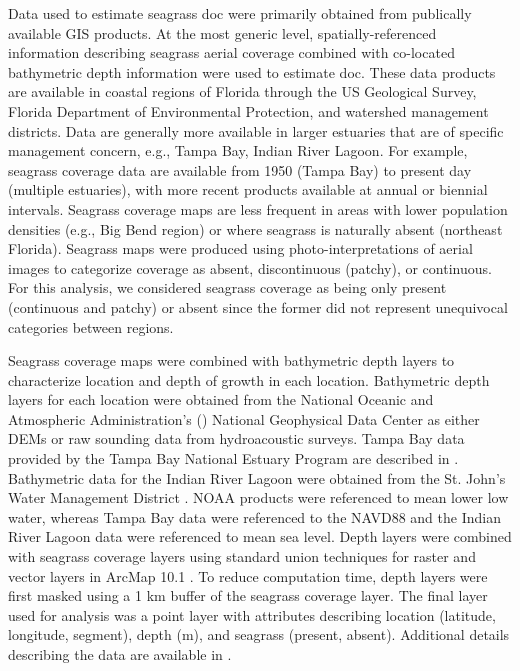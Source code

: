 \documentclass[letterpaper,12pt,oneside]{article}\usepackage[]{graphicx}\usepackage[]{color}
\begin{document}
Data used to estimate seagrass \ac{doc} were primarily obtained from publically available \ac{GIS} products.  At the most generic level, spatially-referenced information describing seagrass aerial coverage combined with co-located bathymetric depth information were used to estimate \ac{doc}.  These data products are available in coastal regions of Florida through the US Geological Survey, Florida Department of Environmental Protection, and watershed management districts.  Data are generally more available in larger estuaries that are of specific management concern, e.g., Tampa Bay, Indian River Lagoon.  For example, seagrass coverage data are available from 1950 (Tampa Bay) to present day (multiple estuaries), with more recent products available at annual or  biennial intervals.  Seagrass coverage maps are less frequent in areas with lower population densities (e.g., Big Bend region) or where seagrass is naturally absent (northeast Florida).  Seagrass maps were produced using photo-interpretations of aerial images to categorize coverage as absent, discontinuous (patchy), or continuous.  For this analysis, we considered seagrass coverage as being only present (continuous and patchy) or absent since the former did not represent unequivocal categories between regions. 

Seagrass coverage maps were combined with bathymetric depth layers to characterize location and depth of growth in each location.  Bathymetric depth layers for each location were obtained from the National Oceanic and Atmospheric Administration's () National Geophysical Data Center as either \acp{DEM} or raw sounding data from hydroacoustic surveys.  Tampa Bay data provided by the Tampa Bay National Estuary Program are described in \citet{Tyler07}. Bathymetric data for the Indian River Lagoon were obtained from the St. John's Water Management District \citep{CPE97}.  \ac{NOAA} products were referenced to mean lower low water, whereas Tampa Bay data were referenced to the \ac{NAVD88} and the Indian River Lagoon data were referenced to mean sea level.  Depth layers were combined with seagrass coverage layers using standard union techniques for raster and vector layers in ArcMap 10.1 \citep{ESRI12}.  To reduce computation time, depth layers were first masked using a 1 km buffer of the seagrass coverage layer.  The final layer used for analysis was a point layer with attributes describing location (latitude, longitude, segment), depth (m), and seagrass (present, absent).  Additional details describing the data are available in .  
\end{document}
